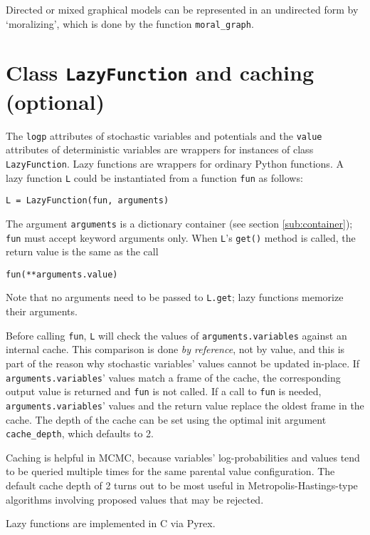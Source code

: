 Directed or mixed graphical models can be represented in an undirected form by `moralizing', which is done by the function \texttt{moral_graph}.

\section{Class \texttt{LazyFunction} and caching (optional)}
\label{sec:caching} 

The \texttt{logp} attributes of stochastic variables and potentials and the \texttt{value} attributes of deterministic variables are wrappers for instances of class \texttt{LazyFunction}. Lazy functions are wrappers for ordinary Python functions. A lazy function \texttt{L} could be instantiated from a function \texttt{fun} as follows:
\begin{verbatim}
L = LazyFunction(fun, arguments)
\end{verbatim}
The argument \texttt{arguments} is a dictionary container (see section \ref{sub:container}); \texttt{fun} must accept keyword arguments only. When \texttt{L}'s \texttt{get()} method is called, the return value is the same as the call 
\begin{verbatim}
fun(**arguments.value)
\end{verbatim}
Note that no arguments need to be passed to \texttt{L.get}; lazy functions memorize their arguments.

Before calling \texttt{fun}, \texttt{L} will check the values of \texttt{arguments.variables} against an internal cache. This comparison is done \emph{by reference}, not by value, and this is part of the reason why stochastic variables' values cannot be updated in-place. If \texttt{arguments.variables}' values match a frame of the cache, the corresponding output value is returned and \texttt{fun} is not called. If a call to \texttt{fun} is needed, \texttt{arguments.variables}' values and the return value replace the oldest frame in the cache. The depth of the cache can be set using the optimal init argument \texttt{cache_depth}, which defaults to 2.

Caching is helpful in MCMC, because variables' log-probabilities and values tend to be queried multiple times for the same parental value configuration. The default cache depth of 2 turns out to be most useful in Metropolis-Hastings-type algorithms involving proposed values that may be rejected.

Lazy functions are implemented in C via Pyrex.